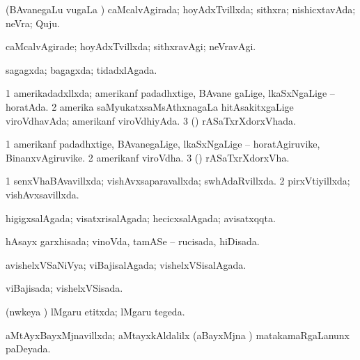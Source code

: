 {\bentry
{} 
\gl{\gu}
\expl{}
\bmng
(BAvanegaLu \mo vugaLa \vi) caMcalvAgirada; hoyAdxTvillxda; sithxra; nishicxtavAda; neVra; Quju. 
\emng
\eentry

\bentry
{} 
\gl{\kirxvi}
\expl{}
\bmng
caMcalvAgirade; hoyAdxTvillxda; sithxravAgi; neVravAgi. 
\emng
\eentry

\bentry
{} 
\gl{\gu}
\expl{}
\bmng
sagagxda; bagagxda; tidadxlAgada. 
\emng
\eentry

\bentry
{} 
\gl{\gu}
\expl{}
\bmng
\bnum
\num{1} amerikadadxllxda; amerikanf padadhxtige, BAvane gaLige, lkaSxNgaLige -- horatAda. 
\num{2} amerika saMyukatxsaMsAthxnagaLa hitAsakitxgaLige viroVdhavAda; amerikanf viroVdhiyAda. 
\num{3} (\ame) rASaTxrXdorxVhada. 
\enum
\emng
\eentry

\bentry
{} 
\gl{\nA}
\expl{}
\bmng
\bnum
\num{1} amerikanf padadhxtige, BAvanegaLige, lkaSxNgaLige -- horatAgiruvike, BinanxvAgiruvike. 
\num{2} amerikanf viroVdha. 
\num{3} (\ame) rASaTxrXdorxVha. 
\enum
\emng
\eentry

\bentry
{} 
\gl{\gu}
\expl{}
\bmng
\bnum
\num{1} senxVhaBAvavillxda; vishAvxsaparavallxda; swhAdaRvillxda. 
\num{2} pirxVtiyillxda; vishAvxsavillxda. 
\enum
\emng
\eentry

\bentry
{} 
\gl{\gu}
\expl{}
\bmng
higigxsalAgada; visatxrisalAgada; hecicxsalAgada; avisatxqqta. 
\emng
\eentry

\bentry
{} 
\gl{\gu}
\expl{}
\bmng
hAsayx garxhisada; vinoVda, tamASe -- rucisada, hiDisada. 
\emng
\eentry

\bentry
{} 
\gl{\gu}
\expl{}
\bmng
avishelxVSaNiVya; viBajisalAgada; vishelxVSisalAgada. 
\emng
\eentry

\bentry
{} 
\gl{\gu}
\expl{}
\bmng
viBajisada; vishelxVSisada. 
\emng
\eentry

\bentry
{} 
\gl{\gu}
\expl{}
\bmng
(nwkeya \vi) lMgaru etitxda; lMgaru tegeda. 
\emng
\eentry

\bentry
{} 
\gl{\gu}
\expl{(\roVkAyx) (\pArxparx) }
\bmng
aMtAyxBayxMjnavillxda; aMtayxkAldalilx (aBayxMjna \mo) matakamaRgaLanunx paDeyada. 
\emng
\eentry

}
